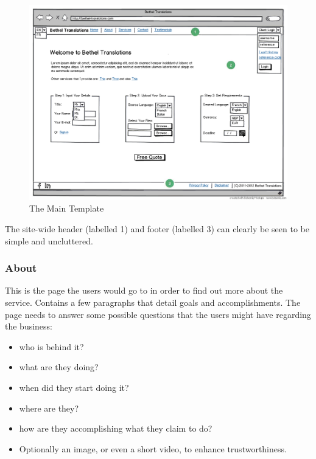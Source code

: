 \documentclass{l3proj}
\begin{document}
\begin{figure}[ht]
\label{wireframes:main-template}
\begin{center}
\includegraphics[width=\linewidth]{wireframes/bt-homepagev3}
\caption{The Main Template}
\end{center}
\end{figure}

The site-wide header (labelled 1) and footer (labelled 3) can clearly be seen to be simple and uncluttered.


\subsubsection{About}
This is the page the users would go to in order to find out more about the
service. Contains a few paragraphs that detail goals and accomplishments.
The page needs to answer some possible questions that the users might have
regarding the business:
\begin{itemize}
	\item who is behind it?
	\item what are they doing?
	\item when did they start doing it?
	\item where are they?
	\item how are they accomplishing what they claim to do?
	\item Optionally an image, or even a short video, to enhance trustworthiness.
\end{itemize}
\end{document}
